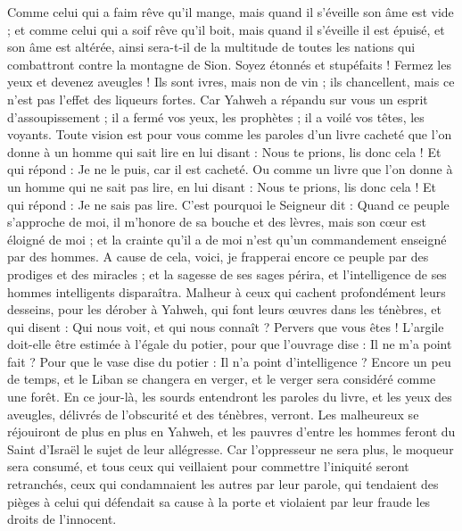 \begin{multicols}{2}
Comme celui qui a faim rêve qu'il mange, mais quand il s'éveille son âme est vide ; et comme celui qui a soif rêve qu'il boit, mais quand il s'éveille il est épuisé, et son âme est altérée, ainsi sera-t-il de la multitude de toutes les nations qui combattront contre la montagne de Sion.
Soyez étonnés et stupéfaits ! Fermez les yeux et devenez aveugles ! Ils sont ivres, mais non de vin ; ils chancellent, mais ce n'est pas l'effet des liqueurs fortes.
Car Yahweh a répandu sur vous un esprit d'assoupissement ; il a fermé vos yeux, les prophètes ; il a voilé vos têtes, les voyants.
Toute vision est pour vous comme les paroles d'un livre cacheté que l'on donne à un homme qui sait lire en lui disant : Nous te prions, lis donc cela ! Et qui répond : Je ne le puis, car il est cacheté.
Ou comme un livre que l'on donne à un homme qui ne sait pas lire, en lui disant : Nous te prions, lis donc cela ! Et qui répond : Je ne sais pas lire.
C'est pourquoi le Seigneur dit : Quand ce peuple s'approche de moi, il m'honore de sa bouche et des lèvres, mais son cœur est éloigné de moi ; et la crainte qu'il a de moi n'est qu'un commandement enseigné par des hommes.
A cause de cela, voici, je frapperai encore ce peuple par des prodiges et des miracles ; et la sagesse de ses sages périra, et l'intelligence de ses hommes intelligents disparaîtra.
Malheur à ceux qui cachent profondément leurs desseins, pour les dérober à Yahweh, qui font leurs œuvres dans les ténèbres, et qui disent : Qui nous voit, et qui nous connaît ?
Pervers que vous êtes ! L'argile doit-elle être estimée à l'égale du potier, pour que l'ouvrage dise : Il ne m'a point fait ? Pour que le vase dise du potier : Il n'a point d'intelligence ?
Encore un peu de temps, et le Liban se changera en verger, et le verger sera considéré comme une forêt.
En ce jour-là, les sourds entendront les paroles du livre, et les yeux des aveugles, délivrés de l'obscurité et des ténèbres, verront.
Les malheureux se réjouiront de plus en plus en Yahweh, et les pauvres d'entre les hommes feront du Saint d'Israël le sujet de leur allégresse.
Car l'oppresseur ne sera plus, le moqueur sera consumé, et tous ceux qui veillaient pour commettre l'iniquité seront retranchés,
ceux qui condamnaient les autres par leur parole, qui tendaient des pièges à celui qui défendait sa cause à la porte et violaient par leur fraude les droits de l'innocent.

\end{multicols}
